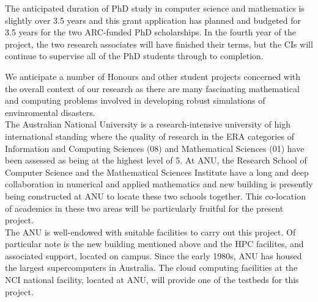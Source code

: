 The anticipated duration of PhD study in computer science and mathematics is slightly over 3.5 years and this grant application has planned and budgeted for 3.5 years for the two ARC-funded PhD scholarships. In the fourth year of the project, the two research associates will have finished their terms, but the CIs will continue to supervise all of the PhD students through to completion.  


We anticipate a number of Honours and other student projects concerned with the overall context of our research as there are many 
fascinating mathematical and computing problems involved in developing robust simulations of envinromental disasters.\\

The Australian National University is a research-intensive university
of high international standing where the quality of research in the ERA categories of 
 Information and Computing
Sciences (08) and Mathematical Sciences (01) have been assessed as
being at the highest level of 5. At ANU, the Research School of
Computer Science and the Mathematical Sciences Institute have a long
and deep collaboration in numerical and applied mathematics and new building is presently being constructed at ANU to
locate these two schools together. This co-location of academics in these two
areas will be particularly fruitful for the present project.\\


The ANU is well-endowed with suitable facilities to carry out this project. Of particular note is the new building mentioned above and the HPC facilites, and associated support, located on campus.
Since the early 1980s, ANU has housed the
largest supercomputers in Australia. The cloud computing facilities at the NCI national
facility, located at ANU, will provide one of the testbeds for this
project.




